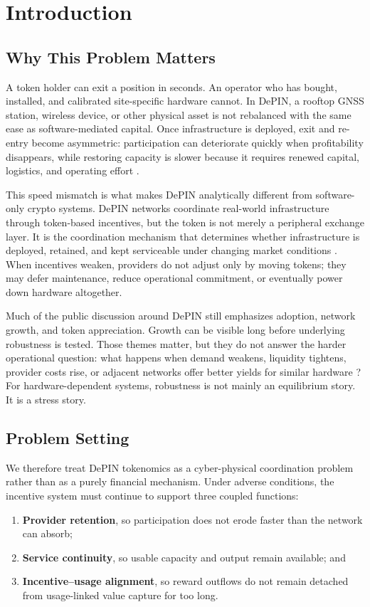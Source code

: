 \section{Introduction}
\label{sec:introduction}

\subsection{Why This Problem Matters}
A token holder can exit a position in seconds. An operator who has bought, installed, and calibrated site-specific hardware cannot. In DePIN, a rooftop GNSS station, wireless device, or other physical asset is not rebalanced with the same ease as software-mediated capital. Once infrastructure is deployed, exit and re-entry become asymmetric: participation can deteriorate quickly when profitability disappears, while restoring capacity is slower because it requires renewed capital, logistics, and operating effort \cite{Ballandies2023, Lin2024, Arthur1989}.

This speed mismatch is what makes DePIN analytically different from software-only crypto systems. DePIN networks coordinate real-world infrastructure through token-based incentives, but the token is not merely a peripheral exchange layer. It is the coordination mechanism that determines whether infrastructure is deployed, retained, and kept serviceable under changing market conditions \cite{Messari2024, FrontiersDePIN2025}. When incentives weaken, providers do not adjust only by moving tokens; they may defer maintenance, reduce operational commitment, or eventually power down hardware altogether.

Much of the public discussion around DePIN still emphasizes adoption, network growth, and token appreciation. Growth can be visible long before underlying robustness is tested. Those themes matter, but they do not answer the harder operational question: what happens when demand weakens, liquidity tightens, provider costs rise, or adjacent networks offer better yields for similar hardware \cite{Ho2022, Chiu2024}? For hardware-dependent systems, robustness is not mainly an equilibrium story. It is a stress story.

\subsection{Problem Setting}
We therefore treat DePIN tokenomics as a cyber-physical coordination problem rather than as a purely financial mechanism. Under adverse conditions, the incentive system must continue to support three coupled functions:
\begin{enumerate}
    \item \textbf{Provider retention}, so participation does not erode faster than the network can absorb;
    \item \textbf{Service continuity}, so usable capacity and output remain available; and
    \item \textbf{Incentive--usage alignment}, so reward outflows do not remain detached from usage-linked value capture for too long.
\end{enumerate}

